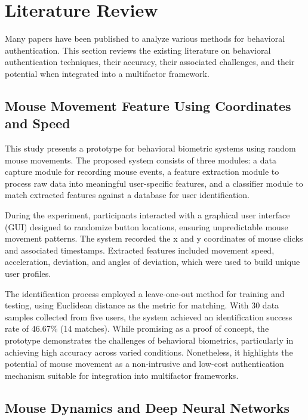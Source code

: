 \section{Literature Review}
\label{sec:literature-review}

Many papers have been published to analyze various methods for behavioral authentication. This section reviews the existing literature on behavioral authentication techniques, their accuracy, their associated challenges, and their potential when integrated into a multifactor framework.

\subsection{Mouse Movement Feature Using Coordinates and Speed}

\parencite{21_Mouse_Coordinate_Speed} This study presents a prototype for behavioral biometric systems using random mouse movements. The proposed system consists of three modules: a data capture module for recording mouse events, a feature extraction module to process raw data into meaningful user-specific features, and a classifier module to match extracted features against a database for user identification.

During the experiment, participants interacted with a graphical user interface (GUI) designed to randomize button locations, ensuring unpredictable mouse movement patterns. The system recorded the x and y coordinates of mouse clicks and associated timestamps. Extracted features included movement speed, acceleration, deviation, and angles of deviation, which were used to build unique user profiles.

The identification process employed a leave-one-out method for training and testing, using Euclidean distance as the metric for matching. With 30 data samples collected from five users, the system achieved an identification success rate of 46.67\% (14 matches). While promising as a proof of concept, the prototype demonstrates the challenges of behavioral biometrics, particularly in achieving high accuracy across varied conditions. Nonetheless, it highlights the potential of mouse movement as a non-intrusive and low-cost authentication mechanism suitable for integration into multifactor frameworks.

\subsection{Mouse Dynamics and Deep Neural Networks}

